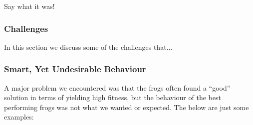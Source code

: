 Say what it was!

\subsubsection{Challenges}

In this section we discuss some of the challenges that...

\subsubsection{Smart, Yet Undesirable Behaviour}

A major problem we encountered was that the frogs often found a ``good'' solution in terms of yielding high fitness, but the behaviour of the best performing frogs was not what we wanted  or expected. The below are just some examples:\\


